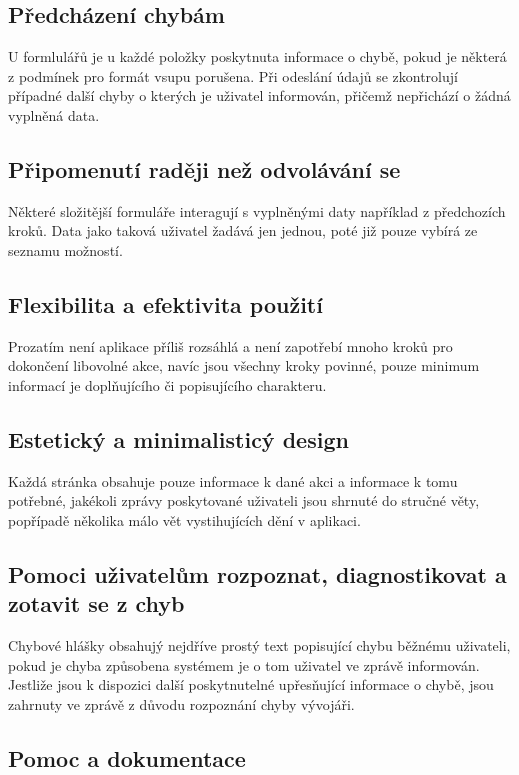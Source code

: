 \documentclass[thesis=B,czech]{FITthesis}[2012/06/26]
\begin{document}
		\subsection{Předcházení chybám}
			U formlulářů je u každé položky poskytnuta informace o chybě, pokud je některá z podmínek pro formát vsupu porušena. Při odeslání údajů se zkontrolují případné další chyby o kterých je uživatel informován, přičemž nepřichází o žádná vyplněná data.

		\subsection{Připomenutí raději než odvolávání se}
			Některé složitější formuláře interagují s vyplněnými daty například z předchozích kroků. Data jako taková uživatel žadává jen jednou, poté již pouze vybírá ze seznamu možností.

		\subsection{Flexibilita a efektivita použití}
			Prozatím není aplikace příliš rozsáhlá a není zapotřebí mnoho kroků pro dokončení libovolné akce, navíc jsou všechny kroky povinné, pouze minimum informací je doplňujícího či popisujícího charakteru.

		\subsection{Estetický a minimalisticý design}
			Každá stránka obsahuje pouze informace k dané akci a informace k tomu potřebné, jakékoli zprávy poskytované uživateli jsou shrnuté do stručné věty, popřípadě několika málo vět vystihujících dění v aplikaci.

		\subsection{Pomoci uživatelům rozpoznat, diagnostikovat a zotavit se z chyb}
			Chybové hlášky obsahujý nejdříve prostý text popisující chybu běžnému uživateli, pokud je chyba způsobena systémem je o tom uživatel ve zprávě informován. Jestliže jsou k dispozici další poskytnutelné upřesňující informace o chybě, jsou zahrnuty ve zprávě z důvodu rozpoznání chyby vývojáři.

		\subsection{Pomoc a dokumentace}
\end{document}
